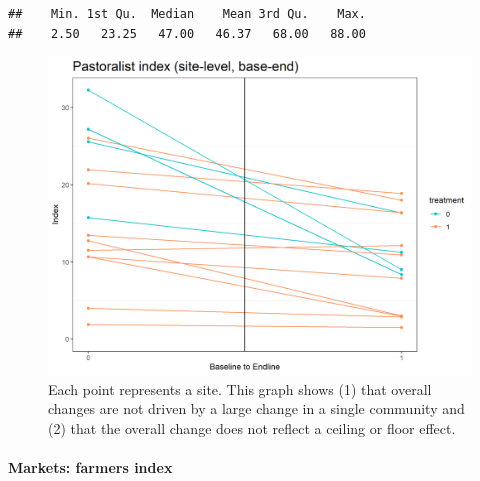 \documentclass[
]{article}
\newenvironment{Shaded}{\begin{snugshade}}{\end{snugshade}}
\newcommand{\DecValTok}[1]{\textcolor[rgb]{0.00,0.00,0.81}{#1}}
\newcommand{\FunctionTok}[1]{\textcolor[rgb]{0.00,0.00,0.00}{#1}}
\newcommand{\NormalTok}[1]{#1}
\newcommand{\SpecialCharTok}[1]{\textcolor[rgb]{0.00,0.00,0.00}{#1}}
\begin{document}
\begin{Shaded}
\end{Shaded}

\begin{verbatim}
##    Min. 1st Qu.  Median    Mean 3rd Qu.    Max. 
##    2.50   23.25   47.00   46.37   68.00   88.00
\end{verbatim}

\begin{figure}%
\centering
\includegraphics[width=\linewidth]{../obs_dat/b_analysis/market_pasts_siteTime.plot.png}
\caption{Each point represents a site. This graph shows (1) that overall changes are not driven by a large change in a single community and (2) that the overall change does not reflect a ceiling or floor effect.}\label{fig:market_past_siteTime}
\end{figure}

\hypertarget{markets-farmers-index}{%
\paragraph{Markets: farmers index}\label{markets-farmers-index}}
\end{document}
